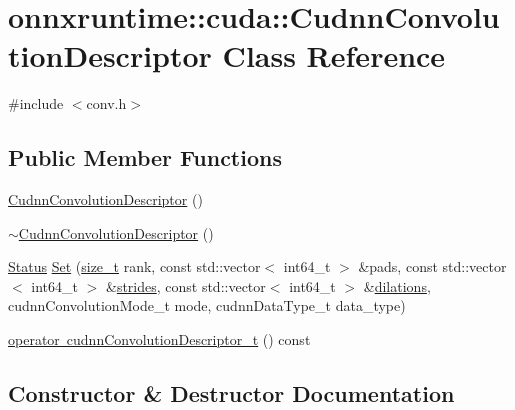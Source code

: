 \hypertarget{classonnxruntime_1_1cuda_1_1CudnnConvolutionDescriptor}{}\section{onnxruntime\+:\+:cuda\+:\+:Cudnn\+Convolution\+Descriptor Class Reference}
\label{classonnxruntime_1_1cuda_1_1CudnnConvolutionDescriptor}


{\ttfamily \#include $<$conv.\+h$>$}

\subsection*{Public Member Functions}
\begin{DoxyCompactItemize}
\item 
\mbox{\hyperlink{classonnxruntime_1_1cuda_1_1CudnnConvolutionDescriptor_a841ed9a68f7bfc17e5f8c198a389f598}{Cudnn\+Convolution\+Descriptor}} ()
\item 
\mbox{\hyperlink{classonnxruntime_1_1cuda_1_1CudnnConvolutionDescriptor_a277564f67b819bcffe426a1c8fd8ac50}{$\sim$\+Cudnn\+Convolution\+Descriptor}} ()
\item 
\mbox{\hyperlink{classonnxruntime_1_1common_1_1Status}{Status}} \mbox{\hyperlink{classonnxruntime_1_1cuda_1_1CudnnConvolutionDescriptor_a333c30a9ab08ede4bc35a23dce3a0365}{Set}} (\mbox{\hyperlink{mlasi_8h_a503efbc1c6e50825320ad909366b78ab}{size\+\_\+t}} rank, const std\+::vector$<$ int64\+\_\+t $>$ \&pads, const std\+::vector$<$ int64\+\_\+t $>$ \&\mbox{\hyperlink{mkldnn_2nn_2pool_8cc_abdced837e2fca213b15df1588e8782c4}{strides}}, const std\+::vector$<$ int64\+\_\+t $>$ \&\mbox{\hyperlink{mkldnn_2nn_2conv_8cc_a57cdc76062a8d113d8204fa0b160836b}{dilations}}, cudnn\+Convolution\+Mode\+\_\+t mode, cudnn\+Data\+Type\+\_\+t data\+\_\+type)
\item 
\mbox{\hyperlink{classonnxruntime_1_1cuda_1_1CudnnConvolutionDescriptor_a29706c17b7cc60713cdbc52c48f2d104}{operator cudnn\+Convolution\+Descriptor\+\_\+t}} () const
\end{DoxyCompactItemize}


\subsection{Constructor \& Destructor Documentation}
\mbox{\label{classonnxruntime_1_1cuda_1_1CudnnConvolutionDescriptor_a841ed9a68f7bfc17e5f8c198a389f598}} 
